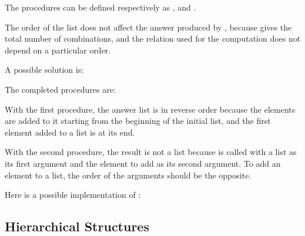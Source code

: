 \begin{exe}[2.19]
    The procedures can be defined respectively as ,  and 
    .

    The order of the list  does not affect the answer produced 
    by , because  gives the total number of combinations, and 
    the relation used for the computation does not depend on a particular order.
\end{exe}

\begin{exe}[2.20]
    A possible solution is:
\end{exe}

\begin{exe}[2.21]
    The completed procedures are:
\end{exe}

\begin{exe}[2.22]
    With the first procedure, the answer list is in reverse order because the 
    elements are added to it starting from the beginning of the initial list, 
    and the first element added to a list is at its end.

    With the second procedure, the result is not a list because  is 
    called with a list as its first argument and the element to add as its 
    second argument. To add an element to a list, the order of the arguments 
    should be the opposite.
\end{exe}

\begin{exe}[2.23]
    Here is a possible implementation of :
\end{exe}

\subsection{Hierarchical Structures}

